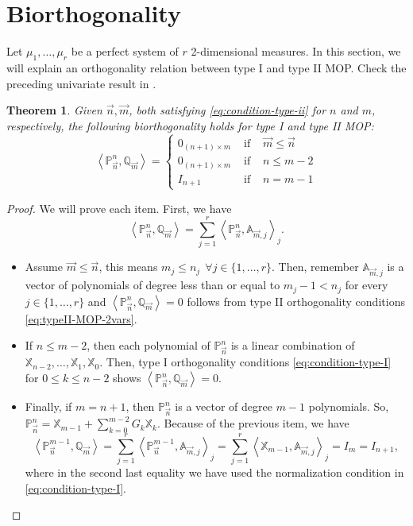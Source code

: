 \documentclass[12pt,a4]{article}
\theoremstyle{plain}
\newtheorem{theorem}{Theorem}[section]
\newcommand{\prodesc}[2]{\left\langle #1 , #2 \right\rangle}
\begin{document}
\section{Biorthogonality}

Let $\mu_1,\dots,\mu_r$ be a perfect system of $r$ 2-dimensional measures. In this section, we will explain an orthogonality relation between type I and type II MOP. Check the preceding univariate result in \cite[Theorem 23.1.6]{Ismail}.

\begin{theorem}
    \label{th:biorthogonality}
    Given $\vec n, \vec m$, both satisfying \eqref{eq:condition-type-ii} for $n$ and $m$, respectively, the following biorthogonality holds for type I and type II MOP:
    \begin{equation}
        \prodesc{\mathbb P_{\vec n}^n}{\mathbb Q_{\vec m}} = \left\{\begin{array}{ccl}
            0_{(n+1)\times m} &   \text{ if } & \vec m \leq \vec n \\
            0_{(n+1)\times m} &   \text{ if } &  n \leq m -2 \\
            I_{n+1} & \text{ if } & n=m-1 
        \end{array}\right.   
    \end{equation}
\end{theorem}
\begin{proof}
    We will prove each item. First, we have
    \begin{equation*}
        \prodesc{\mathbb P_{\vec n}^n}{\mathbb Q_{\vec m}} = \sum_{j=1}^r \prodesc{\mathbb{P}_{\vec n}^n}{\mathbb A_{\vec m, j}}_j.
    \end{equation*}
    \begin{itemize}
        \item Assume $\vec m \leq \vec n$, this means $m_j \leq n_j \ \ \forall j\in\{1,\dots,r\}$. Then, remember $\mathbb{A}_{\vec m,j}$ is a vector of polynomials of degree less than or equal to $m_j-1 < n_j$ for every $j\in\{1,\dots,r\}$ and $\prodesc{\mathbb P_{\vec n}^n}{\mathbb Q_{\vec m}} =0$ follows from type II orthogonality conditions \eqref{eq:typeII-MOP-2vars}.
        \item  If $n\leq m-2$, then each polynomial of $\mathbb P_{\vec n}^n$ is a linear combination of $\mathbb X_{n-2},\dots,\mathbb X_1,\mathbb X_0$. Then, type I orthogonality conditions \eqref{eq:condition-type-I} for $0\leq k\leq n-2$ shows $\prodesc{\mathbb P_{\vec n}^n}{\mathbb Q_{\vec m}} =0$.
        \item Finally, if $m=n+1$, then $\mathbb P_{\vec n}^n$ is a vector of degree $m-1$ polynomials. So, $\mathbb P_{\vec n}^n = \mathbb X_{m-1} + \displaystyle\sum_{k=0}^{m-2} G_{k} \mathbb X_{k}$. Because of the previous item, we have
        $$
        \prodesc{\mathbb P_{\vec n}^{m-1}}{\mathbb Q_{\vec m}} = \sum_{j=1}^r \prodesc{\mathbb{P}_{\vec n}^{m-1}}{\mathbb A_{\vec m, j}}_j = \sum_{j=1}^r \prodesc{\mathbb X_{m-1}}{\mathbb A_{\vec m, j}}_j = I_m = I_{n+1},
        $$
        where in the second last equality we have used the normalization condition in \eqref{eq:condition-type-I}.
    \end{itemize}
\end{proof}
\end{document}
